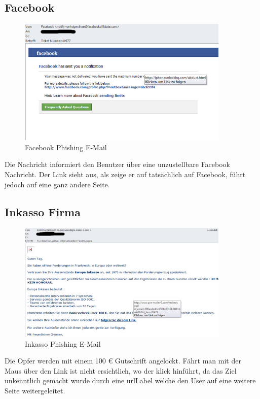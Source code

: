 \subsection{Facebook}
\begin{figure}[H]
  \centering
  \includegraphics[width=0.9\textwidth]{images/phishing-beispiel-facebook.jpg}
  \caption{Facebook Phishing E-Mail}
  \label{fig:phishing:beispiele:facebook}
\end{figure}

Die Nachricht informiert den Benutzer über eine unzustellbare Facebook Nachricht. Der Link sieht aus, als zeige er auf tatsächlich auf Facebook, führt jedoch auf eine ganz andere Seite. 

\subsection{Inkasso Firma}
\begin{figure}[H]
  \centering
  \includegraphics[width=0.9\textwidth]{images/phishing-beispiel-inkasso.jpg}
  \caption{Inkasso Phishing E-Mail}
  \label{fig:phishing:beispiele:inkasso}
\end{figure}

Die Opfer werden mit einem 100 € Gutschrift angelockt. Fährt man mit der Maus über den Link ist nicht ersichtlich, wo der klick hinführt, da das Ziel unkenntlich gemacht wurde durch eine \Gls{urlLabel} welche den User auf eine weitere Seite weitergeleitet.

